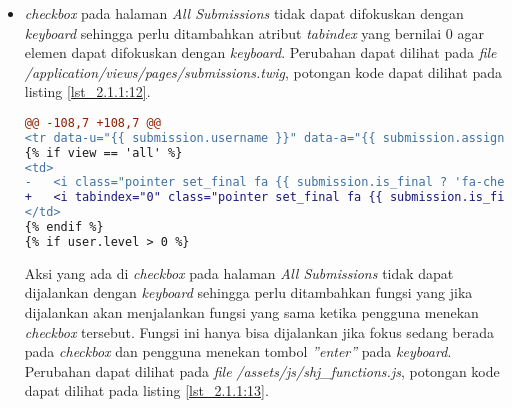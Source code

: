 \begin{itemize}
\begin{lstlisting}[language=diff, caption=Perubahan pada \textit{file} \textit{add\_assignment.twig}, label=lst_2.1.1:11, basicstyle=\ttfamily, frame=single,
columns=fullflexible, keepspaces=true, breaklines=true]
@@ -34,6 +34,16 @@
<td><input type="checkbox" name="is_upload_only[]" class="check" value="PID"/><td><i class="fa fa-times-circle fa-lg color1 delete_problem pointer"></i></td></td>\
</tr>';
$(document).ready(function(){
+ 	$("#add").on('keyup', function (e) {
+ 		if(e.which==13){
+ 			$(this).trigger("click");
+ 		}
+ 	})
+ 	$(".delete_problem").on('keyup', function (e) {
+ 		if(e.which==13){
+ 			$(this).trigger("click");
+ 		}
+ 	})
$("#add").click(function(){
$('#problems_table>tbody').append(shj.row.replace(/PID/g, (shj.num_of_problems+1)));
shj.num_of_problems++;
\end{lstlisting}

	\item \textit{checkbox} pada halaman \textit{All Submissions} tidak dapat difokuskan dengan \textit{keyboard} sehingga perlu ditambahkan atribut \textit{tabindex} yang bernilai 0 agar elemen dapat difokuskan dengan \textit{keyboard}. Perubahan dapat dilihat pada \textit{file} \textit{/application/views/pages/submissions.twig}, potongan kode dapat dilihat pada listing \ref{lst_2.1.1:12}.
	
\begin{lstlisting}[language=diff, caption=Perubahan pada \textit{file} \textit{submissions.twig}, label=lst_2.1.1:12, basicstyle=\ttfamily, frame=single,
columns=fullflexible, keepspaces=true, breaklines=true]
@@ -108,7 +108,7 @@
<tr data-u="{{ submission.username }}" data-a="{{ submission.assignment }}" data-p="{{ submission.problem }}" data-s="{{ submission.submit_id }}" {% if view == 'final' and j is even %}class="hl"{% endif %}>
{% if view == 'all' %}
<td>
- 	<i class="pointer set_final fa {{ submission.is_final ? 'fa-check-circle-o color11' : 'fa-circle-o' }} fa-2x"></i>
+ 	<i tabindex="0" class="pointer set_final fa {{ submission.is_final ? 'fa-check-circle-o color11' : 'fa-circle-o' }} fa-2x"></i>
</td>
{% endif %}
{% if user.level > 0 %}
\end{lstlisting}
	
	Aksi yang ada di \textit{checkbox} pada halaman \textit{All Submissions} tidak dapat dijalankan dengan \textit{keyboard} sehingga perlu ditambahkan fungsi yang jika dijalankan akan menjalankan fungsi yang sama ketika pengguna menekan \textit{checkbox} tersebut. Fungsi ini hanya bisa dijalankan jika fokus sedang berada pada \textit{checkbox} dan pengguna menekan tombol \textit{''enter''} pada \textit{keyboard}. Perubahan dapat dilihat pada \textit{file} \textit{/assets/js/shj\_functions.js}, potongan kode dapat dilihat pada listing \ref{lst_2.1.1:13}.
	

\end{itemize}
